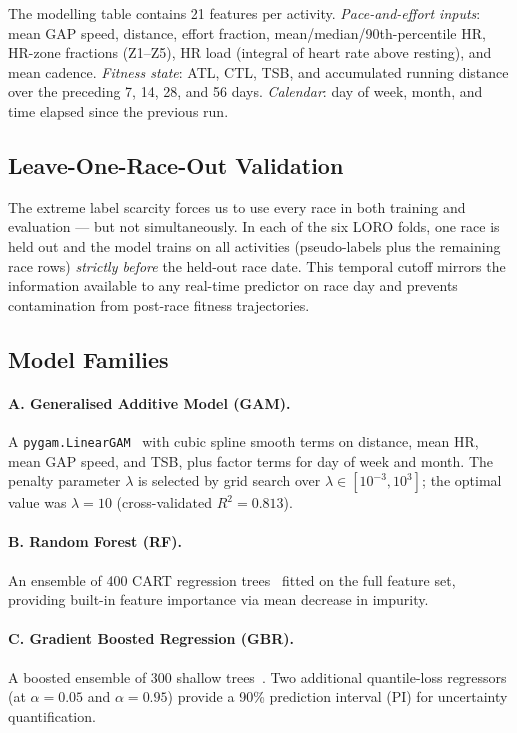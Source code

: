 \documentclass[11pt, a4paper]{article}
\begin{document}
The modelling table contains 21 features per activity.
\emph{Pace-and-effort inputs}: mean GAP speed, distance, effort fraction,
mean/median/90th-percentile HR, HR-zone fractions (Z1--Z5), HR load
(integral of heart rate above resting), and mean cadence.
\emph{Fitness state}: ATL, CTL, TSB, and accumulated running distance over
the preceding 7, 14, 28, and 56 days.
\emph{Calendar}: day of week, month, and time elapsed since the previous run.

\subsection{Leave-One-Race-Out Validation}
\label{ssec:loro}

The extreme label scarcity forces us to use every race in both training
and evaluation --- but not simultaneously.
In each of the six LORO folds, one race is held out and the model trains
on all activities (pseudo-labels plus the remaining race rows) \emph{strictly
before} the held-out race date.
This temporal cutoff mirrors the information available to any real-time
predictor on race day and prevents contamination from post-race fitness
trajectories.

\subsection{Model Families}
\label{ssec:models}

\paragraph{A. Generalised Additive Model (GAM).}
A \texttt{pygam.LinearGAM}~\citep{pygam} with cubic spline smooth terms on
distance, mean HR, mean GAP speed, and TSB, plus factor terms for day of
week and month.
The penalty parameter $\lambda$ is selected by grid search over
$\lambda \in [10^{-3}, 10^3]$; the optimal value was $\lambda = 10$
(cross-validated $R^2 = 0.813$).

\paragraph{B. Random Forest (RF).}
An ensemble of 400 CART regression trees~\citep{Breiman2001} fitted on
the full feature set, providing built-in feature importance via mean
decrease in impurity.

\paragraph{C. Gradient Boosted Regression (GBR).}
A boosted ensemble of 300 shallow trees~\citep{Friedman2001}.
Two additional quantile-loss regressors (at $\alpha = 0.05$ and
$\alpha = 0.95$) provide a 90\% prediction interval (PI) for uncertainty
quantification.
\end{document}
